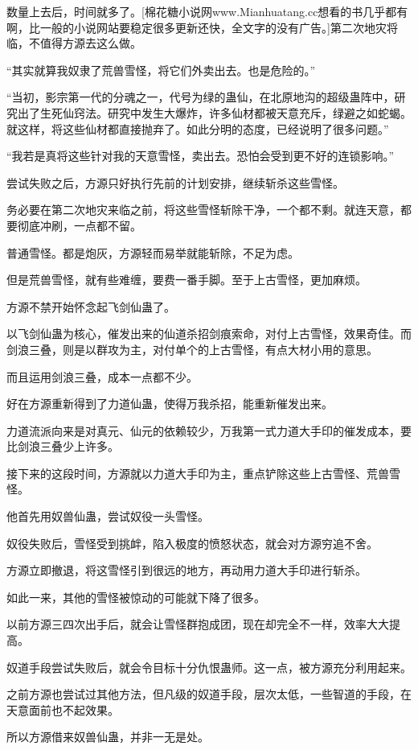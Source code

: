 \begin{this_body}
数量上去后，时间就多了。[棉花糖小说网www.Mianhuatang.cc想看的书几乎都有啊，比一般的小说网站要稳定很多更新还快，全文字的没有广告。]第二次地灾将临，不值得方源去这么做。

“其实就算我奴隶了荒兽雪怪，将它们外卖出去。也是危险的。”

“当初，影宗第一代的分魂之一，代号为绿的蛊仙，在北原地沟的超级蛊阵中，研究出了生死仙窍法。研究中发生大爆炸，许多仙材都被天意充斥，绿避之如蛇蝎。就这样，将这些仙材都直接抛弃了。如此分明的态度，已经说明了很多问题。”

“我若是真将这些针对我的天意雪怪，卖出去。恐怕会受到更不好的连锁影响。”

尝试失败之后，方源只好执行先前的计划安排，继续斩杀这些雪怪。

务必要在第二次地灾来临之前，将这些雪怪斩除干净，一个都不剩。就连天意，都要彻底冲刷，一点都不留。

普通雪怪。都是炮灰，方源轻而易举就能斩除，不足为虑。

但是荒兽雪怪，就有些难缠，要费一番手脚。至于上古雪怪，更加麻烦。

方源不禁开始怀念起飞剑仙蛊了。

以飞剑仙蛊为核心，催发出来的仙道杀招剑痕索命，对付上古雪怪，效果奇佳。而剑浪三叠，则是以群攻为主，对付单个的上古雪怪，有点大材小用的意思。

而且运用剑浪三叠，成本一点都不少。

好在方源重新得到了力道仙蛊，使得万我杀招，能重新催发出来。

力道流派向来是对真元、仙元的依赖较少，万我第一式力道大手印的催发成本，要比剑浪三叠少上许多。

接下来的这段时间，方源就以力道大手印为主，重点铲除这些上古雪怪、荒兽雪怪。

他首先用奴兽仙蛊，尝试奴役一头雪怪。

奴役失败后，雪怪受到挑衅，陷入极度的愤怒状态，就会对方源穷追不舍。

方源立即撤退，将这雪怪引到很远的地方，再动用力道大手印进行斩杀。

如此一来，其他的雪怪被惊动的可能就下降了很多。

以前方源三四次出手后，就会让雪怪群抱成团，现在却完全不一样，效率大大提高。

奴道手段尝试失败后，就会令目标十分仇恨蛊师。这一点，被方源充分利用起来。

之前方源也尝试过其他方法，但凡级的奴道手段，层次太低，一些智道的手段，在天意面前也不起效果。

所以方源借来奴兽仙蛊，并非一无是处。


\end{this_body}
